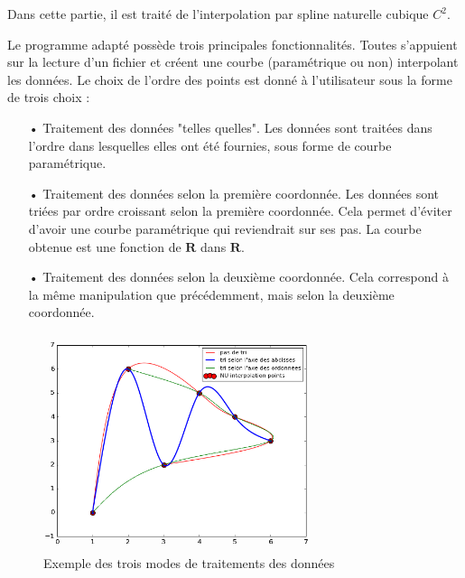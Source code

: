 \documentclass[a4paper,12pt]{article} %
\begin{document}
Dans cette partie, il est traité de l'interpolation par spline naturelle cubique $C^{2}$.

Le programme adapté possède trois principales fonctionnalités. Toutes s'appuient sur la lecture d'un fichier et créent une courbe (paramétrique ou non) interpolant les données.
Le choix de l'ordre des points est donné à l'utilisateur sous la forme de trois choix : 


\begin{itemize}
    \item[•] Traitement des données "telles quelles". Les données sont traitées dans l'ordre dans lesquelles elles ont été fournies, sous forme de courbe paramétrique.
    \item[•] Traitement des données selon la première coordonnée. Les données sont triées par ordre croissant selon la première coordonnée. Cela permet d'éviter d'avoir une courbe paramétrique qui reviendrait sur ses pas. La courbe obtenue est une fonction de $\mathbf{R}$ dans $\mathbf{R}$.
    \item[•] Traitement des données selon la deuxième coordonnée. Cela correspond à la même manipulation que précédemment, mais selon la deuxième coordonnée.
\end{itemize}

\begin{figure}[h]
\begin{center}
\includegraphics[width=8cm]{tache0.png} 
\end{center}
\caption{Exemple des trois modes de traitements des données}
\end{figure}
\end{document}
